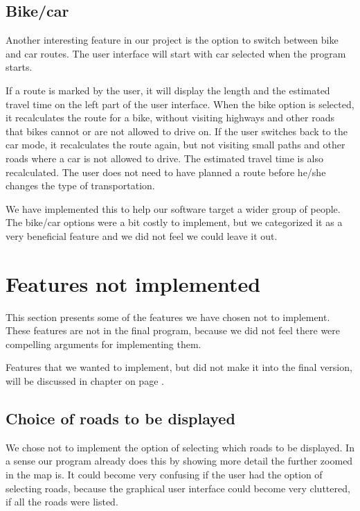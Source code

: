 \subsection{Bike/car}
\label{UIA-IF-BC}
Another interesting feature in our  project is the option
to switch between bike and car routes. The user interface will start with car
selected when the program starts.

If a route is marked by the user, it will display the length and the estimated
travel time on the left part of the user interface. When the bike option is selected, 
it recalculates the route for a bike, without visiting highways and other roads 
that bikes cannot or are not allowed to drive on. If the user switches back to the 
car mode, it recalculates the route again, but not visiting small paths and other 
roads where a car is not allowed to drive. The estimated travel time is also 
recalculated. The user does not need to have planned a route before he/she 
changes the type of transportation.

We have implemented this to help our software target a wider group of people.
The bike/car options were a bit costly to implement, but we categorized it as a
very beneficial feature and we did not feel we could leave it out.

\section{Features not implemented}
\label{UIA-NI}
This section presents some of the features we have chosen not to implement.
These features are not in the final program, because we did not feel there were
compelling arguments for implementing them.

Features that we wanted to implement, but did not make it into the final version,
will be discussed in chapter  on page \pageref{PRC}.

\subsection{Choice of roads to be displayed}
\label{UIA-NI-CRD}
We chose not to implement the option of selecting which roads to be displayed.
In a sense our program already does this by showing more detail the further
zoomed in the map is. It could become very confusing if the user had the option
of selecting roads, because the graphical user interface could become very
cluttered, if all the roads were listed.

